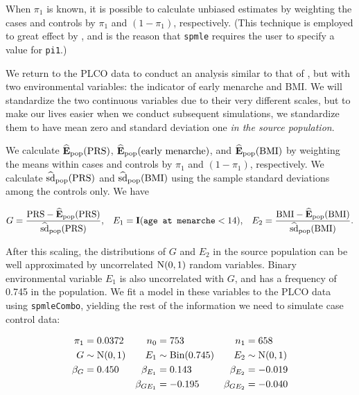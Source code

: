 \documentclass[11pt,]{article}
\begin{document}
When \(\pi_1\) is known, it is possible to calculate unbiased estimates
by weighting the cases and controls by \(\pi_1\) and \((1 - \pi_1)\),
respectively. (This technique is employed to great effect by
\citeauthor{Stalder2017}, and is the reason that \texttt{spmle} requires
the user to specify a value for \texttt{pi1}.)

We return to the PLCO data to conduct an analysis similar to that of
\citeauthor{Wang2018unpublished}, but with two environmental variables:
the indicator of early menarche and BMI. We will standardize the two
continuous variables due to their very different scales, but to make our
lives easier when we conduct subsequent simulations, we standardize them
to have mean zero and standard deviation one
\emph{in the source population}.

We calculate \(\mathbf{\widehat{E}_{\rm pop}}(\rm PRS)\),
\(\mathbf{\widehat{E}_{\rm pop}}(\text{early menarche})\), and
\(\mathbf{\widehat{E}_{\rm pop}}(\rm BMI)\) by weighting the means
within cases and controls by \(\pi_1\) and \((1 - \pi_1)\),
respectively. We calculate \(\widehat{\hbox{sd}}_{\rm pop}(\rm PRS)\)
and \(\widehat{\hbox{sd}}_{\rm pop}(\rm BMI)\) using the sample standard
deviations among the controls only. We have

\begin{align*}
  G = \frac{{\rm PRS} - \mathbf{\widehat{E}_{\rm pop}}(\rm PRS)}{\widehat{\hbox{sd}}_{\rm pop}(\rm PRS)}, && E_1 = \mathbf{I}(\texttt{age at menarche} < 14), && E_2 = \frac{{\rm BMI} - \mathbf{\widehat{E}_{\rm pop}}(\rm BMI)}{\widehat{\hbox{sd}}_{\rm pop}(\rm BMI)}.
\end{align*}

After this scaling, the distributions of \(G\) and \(E_2\) in the source
population can be well approximated by uncorrelated \(\hbox{N}(0, 1)\)
random variables. Binary environmental variable \(E_1\) is also
uncorrelated with \(G\), and has a frequency of 0.745 in the population.
We fit a model in these variables to the PLCO data using
\texttt{spmleCombo}, yielding the rest of the information we need to
simulate case control data:

\begin{align*}
  \pi_1   & =    0.0372        & n_0          & =    753               & n_1          & =     658          \\
  G       & \sim \hbox{N}(0,1) & E_1          & \sim \hbox{Bin}(0.745) & E_2          & \sim \hbox{N}(0,1) \\
  \beta_G & =    0.450         & \beta_{E_1}  & =    0.143             & \beta_{E_2}  & =    -0.019        \\
          &                    & \beta_{GE_1} & =   -0.195             & \beta_{GE_2} & =    -0.040
\end{align*}
\end{document}
